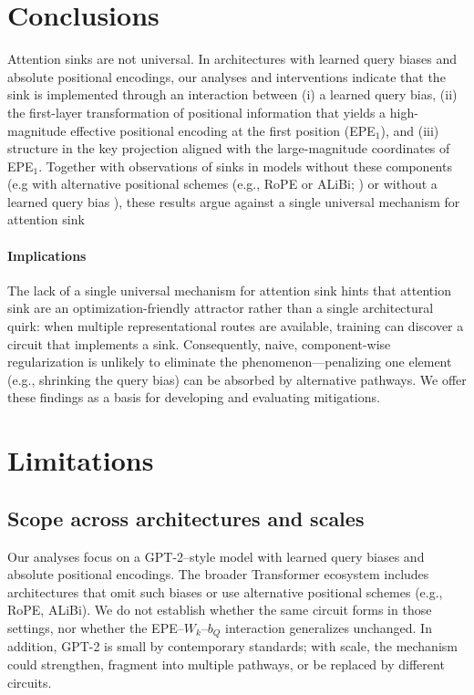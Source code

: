 \documentclass[11pt]{article}
\newif\ifYRMcomments
\newcommand{\YRM}[1]{\ifYRMcomments\textcolor{red}{[YRM: #1]}\fi}
\begin{document}
\section{Conclusions}
Attention sinks are not universal. In architectures with learned query biases and absolute positional encodings, our analyses and interventions indicate that the sink is implemented through an interaction between (i) a learned query bias, (ii) the first-layer transformation of positional information that yields a high-magnitude effective positional encoding at the first position (EPE$_1$), and (iii) structure in the key projection aligned with the large-magnitude coordinates of EPE$_1$. Together with observations of sinks in models without these components (e.g with alternative positional schemes (e.g., RoPE or ALiBi; \YRM{cite}) or without a learned query bias \YRM{cite}), these results argue against a single universal mechanism for attention sink

\paragraph{Implications}
The lack of a single universal mechanism for attention sink hints that attention sink are an optimization-friendly attractor rather than a single architectural quirk: when multiple representational routes are available, training can discover a circuit that implements a sink. Consequently, naive, component-wise regularization is unlikely to eliminate the phenomenon—penalizing one element (e.g., shrinking the query bias) can be absorbed by alternative pathways. We offer these findings as a basis for developing and evaluating mitigations.



\section{Limitations}

\subsection{Scope across architectures and scales}
Our analyses focus on a GPT-2–style model with learned query biases and absolute positional encodings. The broader Transformer ecosystem includes architectures that omit such biases or use alternative positional schemes (e.g., RoPE, ALiBi). We do not establish whether the same circuit forms in those settings, nor whether the EPE–$W_k$–$b_Q$ interaction generalizes unchanged. In addition, GPT-2 is small by contemporary standards; with scale, the mechanism could strengthen, fragment into multiple pathways, or be replaced by different circuits.
\end{document}
